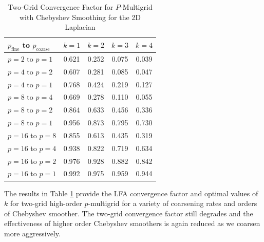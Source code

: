 \begin{table}[ht!]
\begin{center}
\begin{tabular}{l c c c c}
  \toprule
  $p_{\text{fine}}$ to $p_{\text{coarse}}$  &  $k = 1$   &  $k = 2$   &  $k = 3$   &  $k = 4$   \\
  \toprule
  $p = 2$ to $p = 1$   &  0.621  &  0.252  &  0.075  &  0.039  \\
  \midrule
  $p = 4$ to $p = 2$   &  0.607  &  0.281  &  0.085  &  0.047  \\
  $p = 4$ to $p = 1$   &  0.768  &  0.424  &  0.219  &  0.127  \\
  \midrule
  $p = 8$ to $p = 4$   &  0.669  &  0.278  &  0.110  &  0.055  \\
  $p = 8$ to $p = 2$   &  0.864  &  0.633  &  0.456  &  0.336  \\
  $p = 8$ to $p = 1$   &  0.956  &  0.873  &  0.795  &  0.730  \\
  \midrule
  $p = 16$ to $p = 8$  &  0.855  &  0.613  &  0.435  &  0.319  \\
  $p = 16$ to $p = 4$  &  0.938  &  0.822  &  0.719  &  0.634  \\
  $p = 16$ to $p = 2$  &  0.976  &  0.928  &  0.882  &  0.842  \\
  $p = 16$ to $p = 1$  &  0.992  &  0.975  &  0.959  &  0.944  \\
  \bottomrule
\end{tabular}
\end{center}
\caption{Two-Grid Convergence Factor for $P$-Multigrid with Chebyshev Smoothing for the 2D Laplacian}
\label{table:two_grid_2d_chebyshev}
\end{table}

The results in Table \ref{table:two_grid_2d_chebyshev} provide the LFA convergence factor and optimal values of $k$ for two-grid high-order $p$-multigrid for a variety of coarsening rates and orders of Chebyshev smoother.
The two-grid convergence factor still degrades and the effectiveness of higher order Chebyshev smoothers is again reduced as we coarsen more aggressively.

